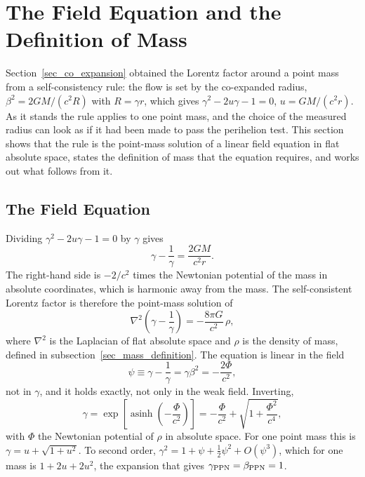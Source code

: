 
\section{The Field Equation and the Definition of Mass}\label{sec_field_equation}

Section~\ref{sec_co_expansion} obtained the Lorentz factor around a point mass from a self-consistency rule: the flow is set by the co-expanded radius, $\beta^2=2GM/(c^2R)$ with $R=\gamma r$, which gives $\gamma^2-2u\gamma-1=0$, $u=GM/(c^2r)$. As it stands the rule applies to one point mass, and the choice of the measured radius can look as if it had been made to pass the perihelion test. This section shows that the rule is the point-mass solution of a linear field equation in flat absolute space, states the definition of mass that the equation requires, and works out what follows from it.

\subsection{The Field Equation}

Dividing $\gamma^2-2u\gamma-1=0$ by $\gamma$ gives
\begin{equation}\label{eq_fe_pointmass}
    \gamma-\frac{1}{\gamma}=\frac{2GM}{c^2r}.
\end{equation}
The right-hand side is $-2/c^2$ times the Newtonian potential of the mass in absolute coordinates, which is harmonic away from the mass. The self-consistent Lorentz factor is therefore the point-mass solution of
\begin{equation}\label{eq_field_equation}
    \nabla^2\!\left(\gamma-\frac{1}{\gamma}\right)=-\frac{8\pi G}{c^2}\,\rho ,
\end{equation}
where $\nabla^2$ is the Laplacian of flat absolute space and $\rho$ is the density of mass, defined in subsection~\ref{sec_mass_definition}. The equation is linear in the field
\begin{equation}\label{eq_field_variable}
    \psi\equiv\gamma-\frac{1}{\gamma}=\gamma\beta^2=-\frac{2\Phi}{c^2},
\end{equation}
not in $\gamma$, and it holds exactly, not only in the weak field. Inverting,
\begin{equation}\label{eq_gamma_asinh}
    \gamma=\exp\!\left[\operatorname{asinh}\!\left(-\frac{\Phi}{c^2}\right)\right]=-\frac{\Phi}{c^2}+\sqrt{1+\frac{\Phi^2}{c^4}} ,
\end{equation}
with $\Phi$ the Newtonian potential of $\rho$ in absolute space. For one point mass this is $\gamma=u+\sqrt{1+u^2}$. To second order, $\gamma^2=1+\psi+\tfrac12\psi^2+O(\psi^3)$, which for one mass is $1+2u+2u^2$, the expansion that gives $\gamma_{\rm PPN}=\beta_{\rm PPN}=1$.

